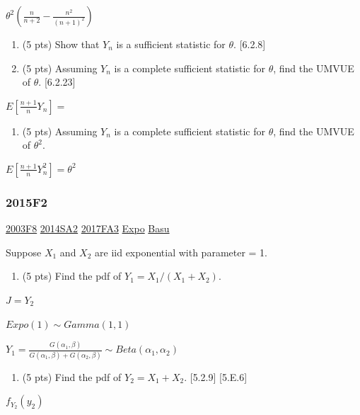 \documentclass[10pt,twocolumn,portrait]{article}
\providecommand{\tightlist}{%
  \setlength{\itemsep}{0pt}\setlength{\parskip}{0pt}}
\begin{document}
\(\theta^2(\frac{n}{n+2}-\frac{n^2}{(n+1)^2})\)

\begin{enumerate}
\def\labelenumi{(\alph{enumi})}
\setcounter{enumi}{2}
\item
  (5 pts) Show that \(Y_n\) is a sufficient statistic for \(\theta\).
  {[}6.2.8{]}
\item
  (5 pts) Assuming \(Y_n\) is a complete sufficient statistic for
  \(\theta\), find the UMVUE of \(\theta\). {[}6.2.23{]}
\end{enumerate}

\(E[\frac{n+1}{n}Y_n]=\)

\begin{enumerate}
\def\labelenumi{(\alph{enumi})}
\setcounter{enumi}{4}
\tightlist
\item
  (5 pts) Assuming \(Y_n\) is a complete sufficient statistic for
  \(\theta\), find the UMVUE of \(\theta^2\).
\end{enumerate}

\(E[\frac{n+1}{n}Y_n^2]=\theta^2\)

\hypertarget{f2-5}{%
\subsubsection{2015F2}\label{f2-5}}

\protect\hyperlink{f8-1}{2003F8} \protect\hyperlink{sa2-2}{2014SA2}
\protect\hyperlink{fa3-3}{2017FA3} \protect\hyperlink{Expo}{Expo}
\protect\hyperlink{Basu}{Basu}

Suppose \(X_1\) and \(X_2\) are iid exponential with parameter = 1.

\begin{enumerate}
\def\labelenumi{(\alph{enumi})}
\tightlist
\item
  (5 pts) Find the pdf of \(Y_1=X_1/(X_1+X_2)\).
\end{enumerate}

\(J=Y_2\)

\(Expo(1)\sim Gamma(1,1)\)

\(Y_1=\frac{G(\alpha_1,\beta)}{G(\alpha_1,\beta)+G(\alpha_2,\beta)}\sim Beta(\alpha_1,\alpha_2)\)

\begin{enumerate}
\def\labelenumi{(\alph{enumi})}
\setcounter{enumi}{1}
\tightlist
\item
  (5 pts) Find the pdf of \(Y_2=X_1+X_2\). {[}5.2.9{]} {[}5.E.6{]}
\end{enumerate}

\(f_{Y_2}(y_2)\)
\end{document}
